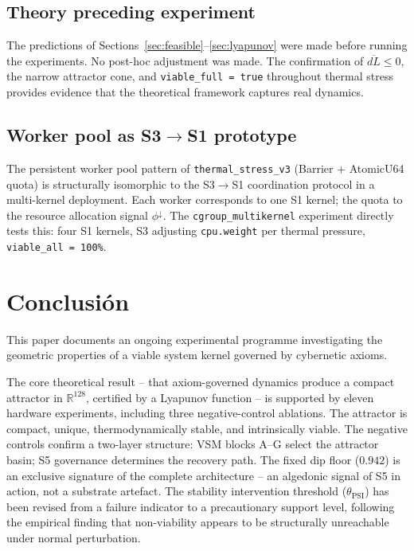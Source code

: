 \documentclass[11pt, a4paper]{article}
\newcommand{\R}{\mathbb{R}}
\begin{document}
\subsection{Theory preceding experiment}

The predictions of Sections~\ref{sec:feasible}--\ref{sec:lyapunov} were
made before running the experiments.
No post-hoc adjustment was made.
The confirmation of $\overline{dL} \le 0$, the narrow attractor cone,
and \texttt{viable\_full = true} throughout thermal stress provides
evidence that the theoretical framework captures real dynamics.

\subsection{Worker pool as S3$\to$S1 prototype}

The persistent worker pool pattern of \texttt{thermal\_stress\_v3}
(Barrier + AtomicU64 quota) is structurally isomorphic to the S3$\to$S1
coordination protocol in a multi-kernel deployment.
Each worker corresponds to one S1 kernel; the quota to the resource
allocation signal $\phi^\downarrow$.
The \texttt{cgroup\_multikernel} experiment directly tests this:
four S1 kernels, S3 adjusting \texttt{cpu.weight} per thermal pressure,
\texttt{viable\_all = 100\%}.


\section{Conclusión}
\label{sec:conclusion}

This paper documents an ongoing experimental programme investigating the
geometric properties of a viable system kernel governed by cybernetic axioms.

The core theoretical result -- that axiom-governed dynamics produce a compact
attractor in $\R^{128}$, certified by a Lyapunov function -- is supported
by eleven hardware experiments, including three negative-control ablations.
The attractor is compact, unique, thermodynamically stable, and
intrinsically viable.
The negative controls confirm a two-layer structure: VSM blocks A--G select
the attractor basin; S5 governance determines the recovery path.
The fixed dip floor ($0.942$) is an exclusive signature of the complete
architecture -- an algedonic signal of S5 in action, not a substrate artefact.
The stability intervention threshold ($\theta_\text{PSI}$) has been
revised from a failure indicator to a precautionary support level,
following the empirical finding that non-viability appears to be
structurally unreachable under normal perturbation.
\end{document}
